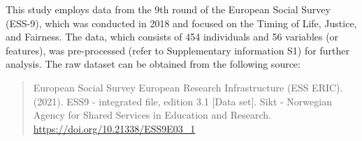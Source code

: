 This study employs data from the 9th round of the European Social Survey (ESS-9), which was conducted in 2018 and focused on the Timing of Life, Justice, and Fairness. The data, which consists of 454 individuals and 56 variables (or features), was pre-processed (refer to Supplementary information S1) for further analysis. The raw dataset can be obtained from the following source:

\begin{quote}
European Social Survey European Research Infrastructure (ESS ERIC). (2021). ESS9 - integrated file, edition 3.1 [Data set]. Sikt - Norwegian Agency for Shared Services in Education and Research. \url{https://doi.org/10.21338/ESS9E03_1}
\end{quote}

\scriptsize
\renewcommand{\arraystretch}{1.2}
\setlength{\LTcapwidth}{\textwidth}


